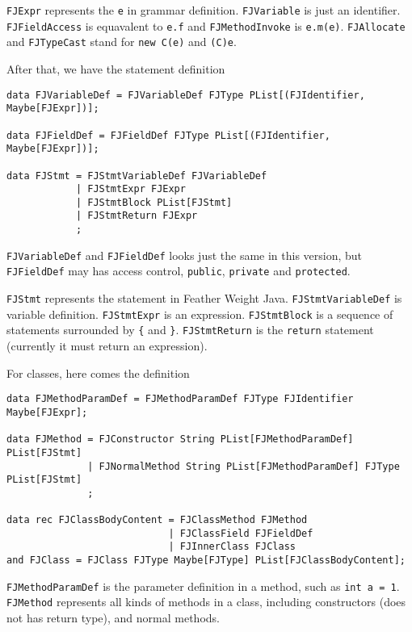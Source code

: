 \texttt{FJExpr} represents the \texttt{e} in grammar definition. \texttt{FJVariable} is just an identifier. \texttt{FJFieldAccess} is equavalent to \texttt{e.f} and \texttt{FJMethodInvoke} is \texttt{e.m(e)}. \texttt{FJAllocate} and \texttt{FJTypeCast} stand for \texttt{new C(e)} and \texttt{(C)e}.

After that, we have the statement definition

\begin{lstlisting}
data FJVariableDef = FJVariableDef FJType PList[(FJIdentifier, Maybe[FJExpr])];

data FJFieldDef = FJFieldDef FJType PList[(FJIdentifier, Maybe[FJExpr])];

data FJStmt = FJStmtVariableDef FJVariableDef
            | FJStmtExpr FJExpr
            | FJStmtBlock PList[FJStmt]
            | FJStmtReturn FJExpr
            ;
\end{lstlisting}

\texttt{FJVariableDef} and \texttt{FJFieldDef} looks just the same in this version, but \texttt{FJFieldDef} may has access control, \texttt{public}, \texttt{private} and \texttt{protected}.

\texttt{FJStmt} represents the statement in Feather Weight Java. \texttt{FJStmtVariableDef} is variable definition. \texttt{FJStmtExpr} is an expression. \texttt{FJStmtBlock} is a sequence of statements surrounded by \texttt{\{} and \texttt{\}}. \texttt{FJStmtReturn} is the \texttt{return} statement (currently it must return an expression).

For classes, here comes the definition

\begin{lstlisting}
data FJMethodParamDef = FJMethodParamDef FJType FJIdentifier Maybe[FJExpr];

data FJMethod = FJConstructor String PList[FJMethodParamDef] PList[FJStmt]
              | FJNormalMethod String PList[FJMethodParamDef] FJType PList[FJStmt]
              ;

data rec FJClassBodyContent = FJClassMethod FJMethod
                            | FJClassField FJFieldDef
                            | FJInnerClass FJClass
and FJClass = FJClass FJType Maybe[FJType] PList[FJClassBodyContent];
\end{lstlisting}

\texttt{FJMethodParamDef} is the parameter definition in a method, such as \texttt{int a = 1}. \texttt{FJMethod} represents all kinds of methods in a class, including constructors (does not has return type), and normal methods.

